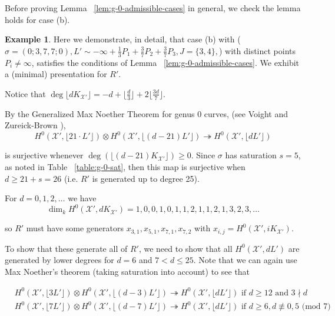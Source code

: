 \documentclass{amsart}
\theoremstyle{plain}
\theoremstyle{definition}
\newtheorem{example}[thm]{Example}
\theoremstyle{remark}
\numberwithin{equation}{section}
\newcommand \sx{\mathscr X}
\newcommand \halfcan{L}
\begin{document}
Before proving Lemma ~\ref{lem:g-0-admissible-cases} in general, we check the lemma holds for case (b).

\begin{example}
\label{ex:base-377}
Here we demonstrate, in detail, that case (b) with ($\sigma =
(0; 3, 7, 7; 0), \halfcan' \sim -\infty + \frac{1}{3} P_1 +
\frac{3}{7} P_2 + \frac{3}{7} P_3, J = \{3, 4\},$) with distinct points $P_i \neq \infty$,
satisfies the conditions of Lemma ~\ref{lem:g-0-admissible-cases}.
We exhibit a (minimal) presentation for $R'$.

Notice that $\deg \lfloor d K_{\sx'} \rfloor= -d + \lfloor \frac{d}{3}
\rfloor + 2 \lfloor \frac{3d}{7} \rfloor$.

By the Generalized Max Noether Theorem for genus 0 curves, (see Voight
and Zureick-Brown \cite[Lemma 3.1.1]{vzb:stacky}),
\[
	H^0 (\sx', \lfloor 21 \cdot \halfcan' \rfloor) \otimes H^0 (\sx', \lfloor
	(d - 21) \halfcan' \rfloor) \twoheadrightarrow H^0 (\sx', \lfloor
	d \halfcan' \rfloor)
\]

\noindent
is surjective whenever $\deg (\lfloor (d - 21) K_{\sx'} \rfloor)
\geq 0$. Since $\sigma$ has saturation $s = 5$, as noted in
Table ~\ref{table:g-0-sat}, then this map is surjective
when $d \geq 21 + s = 26$ (i.e. $R'$ is generated up to degree 25).

For $d = 0, 1, 2, \ldots$ we have
\[
	\dim_k H^0 (\sx', d K_{\sx'}) = 1, 0, 0, 1, 0, 1, 1, 2, 1, 1, 2, 1, 3, 2, 3, \ldots
\]

\noindent
so $R'$ must have some generators $x_{3, 1}, x_{5, 1}, x_{7, 1},
x_{7, 2}$ with $x_{i,j} = H^0(\sx',iK_{\sx'})$.

To show that these generate all of $R'$, we need to show that all
$H^0 (\sx', d \halfcan')$ are generated by lower degrees for $d = 6$
and $7 < d \leq 25$. Note that we can again use Max Noether's theorem
(taking saturation into account) to see that

\begin{align*}
	&H^0 (\sx', \lfloor 3 \halfcan' \rfloor) \otimes H^0 (\sx', \lfloor
	(d - 3) \halfcan' \rfloor) \twoheadrightarrow H^0 (\sx', \lfloor
	d \halfcan' \rfloor) \text{ if } d \geq 12 \text{ and } 3 \nmid d \\
	&H^0 (\sx', \lfloor 7 \halfcan' \rfloor) \otimes H^0 (\sx', \lfloor
	(d - 7) \halfcan' \rfloor) \twoheadrightarrow H^0 (\sx', \lfloor
	d \halfcan' \rfloor) \text{ if } d \geq 6, d \not\equiv 0, 5
	\text{ (mod } 7)
\end{align*}


\end{example}
\end{document}
